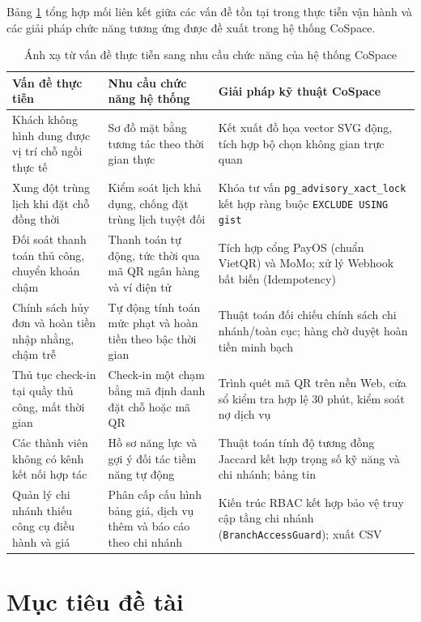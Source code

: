 Bảng \ref{tab:vande_chucnang} tổng hợp mối liên kết giữa các vấn đề tồn tại trong thực tiễn vận hành và các giải pháp chức năng tương ứng được đề xuất trong hệ thống CoSpace.

\begin{table}[H]
\centering
\caption{Ánh xạ từ vấn đề thực tiễn sang nhu cầu chức năng của hệ thống CoSpace}
\label{tab:vande_chucnang}
\small
\renewcommand{\arraystretch}{1.25}
\begin{tabular}{|p{4.2cm}|p{5.2cm}|p{5.0cm}|}
\hline
\textbf{Vấn đề thực tiễn} & \textbf{Nhu cầu chức năng hệ thống} & \textbf{Giải pháp kỹ thuật CoSpace} \\
\hline
Khách không hình dung được vị trí chỗ ngồi thực tế & Sơ đồ mặt bằng tương tác theo thời gian thực & Kết xuất đồ họa vector SVG động, tích hợp bộ chọn không gian trực quan \\
\hline
Xung đột trùng lịch khi đặt chỗ đồng thời & Kiểm soát lịch khả dụng, chống đặt trùng lịch tuyệt đối & Khóa tư vấn \texttt{pg\_advisory\_xact\_lock} kết hợp ràng buộc \texttt{EXCLUDE USING gist} \\
\hline
Đối soát thanh toán thủ công, chuyển khoản chậm & Thanh toán tự động, tức thời qua mã QR ngân hàng và ví điện tử & Tích hợp cổng PayOS (chuẩn VietQR) và MoMo; xử lý Webhook bất biến (Idempotency) \\
\hline
Chính sách hủy đơn và hoàn tiền nhập nhằng, chậm trễ & Tự động tính toán mức phạt và hoàn tiền theo bậc thời gian & Thuật toán đối chiếu chính sách chi nhánh/toàn cục; hàng chờ duyệt hoàn tiền minh bạch \\
\hline
Thủ tục check-in tại quầy thủ công, mất thời gian & Check-in một chạm bằng mã định danh đặt chỗ hoặc mã QR & Trình quét mã QR trên nền Web, cửa sổ kiểm tra hợp lệ 30 phút, kiểm soát nợ dịch vụ \\
\hline
Các thành viên không có kênh kết nối hợp tác & Hồ sơ năng lực và gợi ý đối tác tiềm năng tự động & Thuật toán tính độ tương đồng Jaccard kết hợp trọng số kỹ năng và chi nhánh; bảng tin \\
\hline
Quản lý chi nhánh thiếu công cụ điều hành và giá & Phân cấp cấu hình bảng giá, dịch vụ thêm và báo cáo theo chi nhánh & Kiến trúc RBAC kết hợp bảo vệ truy cập tầng chi nhánh (\texttt{BranchAccessGuard}); xuất CSV \\
\hline
\end{tabular}
\end{table}

\section{Mục tiêu đề tài}
\label{sec:muctieu}

